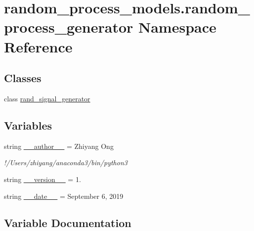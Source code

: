 \hypertarget{namespacerandom__process__models_1_1random__process__generator}{}\section{random\+\_\+process\+\_\+models.\+random\+\_\+process\+\_\+generator Namespace Reference}
\label{namespacerandom__process__models_1_1random__process__generator}
\subsection*{Classes}
\begin{DoxyCompactItemize}
\item 
class \hyperlink{classrandom__process__models_1_1random__process__generator_1_1rand__signal__generator}{rand\+\_\+signal\+\_\+generator}
\end{DoxyCompactItemize}
\subsection*{Variables}
\begin{DoxyCompactItemize}
\item 
string \hyperlink{namespacerandom__process__models_1_1random__process__generator_ad5ac8c8c735362abc3272ed79347b666}{\+\_\+\+\_\+author\+\_\+\+\_\+} = \textquotesingle{}Zhiyang Ong\textquotesingle{}
\begin{DoxyCompactList}\small\item\em !/\+Users/zhiyang/anaconda3/bin/python3 \end{DoxyCompactList}\item 
string \hyperlink{namespacerandom__process__models_1_1random__process__generator_ab646d91986add5570041ec883e29d8da}{\+\_\+\+\_\+version\+\_\+\+\_\+} = \textquotesingle{}1.\textquotesingle{}
\item 
string \hyperlink{namespacerandom__process__models_1_1random__process__generator_ad850a80bfc86ef183d906895e7f75402}{\+\_\+\+\_\+date\+\_\+\+\_\+} = \textquotesingle{}September 6, 2019\textquotesingle{}
\end{DoxyCompactItemize}


\subsection{Variable Documentation}
\hypertarget{namespacerandom__process__models_1_1random__process__generator_ad5ac8c8c735362abc3272ed79347b666}{}
